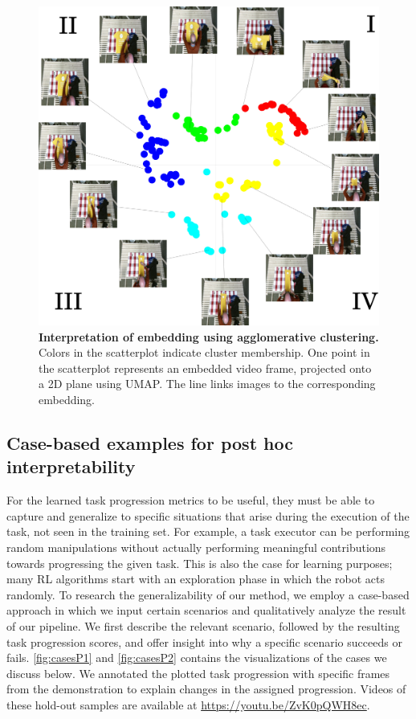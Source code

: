\documentclass[\home/main.tex]{subfiles}
\begin{document}
\begin{figure}[!p]
    \centering
    \includegraphics[width=\textwidth, keepaspectratio]{figures/figs_discussion_wt_572.jpg}
    \caption[Interpretation of embedding using agglomerative clustering]{\textbf{Interpretation of embedding using agglomerative clustering.} Colors in the scatterplot indicate cluster membership. One point in the scatterplot represents an embedded video frame, projected onto a 2D plane using UMAP. The line links images to the corresponding embedding.}
    \label{fig:wt_572}
\end{figure}

\subsection{Case-based examples for post hoc interpretability} \label{subsec:rewards_cases}

For the learned task progression metrics to be useful, they must be able to capture and generalize to specific situations that arise during the execution of the task, not seen in the training set. For example, a task executor can be performing random manipulations without actually performing meaningful contributions towards progressing the given task. This is also the case for learning purposes; many RL algorithms start with an exploration phase in which the robot acts randomly. To research the generalizability of our method, we employ a case-based approach in which we input certain scenarios and qualitatively analyze the result of our pipeline. We first describe the relevant scenario, followed by the resulting task progression scores, and offer insight into why a specific scenario succeeds or fails. \cref{fig:casesP1} and \cref{fig:casesP2} contains the visualizations of the cases we discuss below. We annotated the plotted task progression with specific frames from the demonstration to explain changes in the assigned progression. Videos of these hold-out samples are available at \url{https://youtu.be/ZvK0pQWH8ec}.
\end{document}
